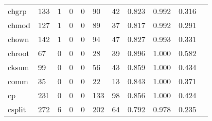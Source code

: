 \begin{longtable}{lp{1.10cm}p{1.10cm}p{1.10cm}p{1.10cm}p{1.10cm}p{1.10cm}p{1.10cm}p{1.10cm}p{1.10cm}p{1.10cm}}
chgrp     &                    133 &                                  1 &                                 0 &                                0 &                                90 &                              42 &                          0.823 &                                 0.992 &                               0.316 \\
chmod     &                    127 &                                  1 &                                 0 &                                0 &                                89 &                              37 &                          0.817 &                                 0.992 &                               0.291 \\
chown     &                    142 &                                  1 &                                 0 &                                0 &                                94 &                              47 &                          0.827 &                                 0.993 &                               0.331 \\
chroot    &                     67 &                                  0 &                                 0 &                                0 &                                28 &                              39 &                          0.896 &                                 1.000 &                               0.582 \\
cksum     &                     99 &                                  0 &                                 0 &                                0 &                                56 &                              43 &                          0.859 &                                 1.000 &                               0.434 \\
comm      &                     35 &                                  0 &                                 0 &                                0 &                                22 &                              13 &                          0.843 &                                 1.000 &                               0.371 \\
cp        &                    231 &                                  0 &                                 0 &                                0 &                               133 &                              98 &                          0.856 &                                 1.000 &                               0.424 \\
csplit    &                    272 &                                  6 &                                 0 &                                0 &                               202 &                              64 &                          0.792 &                                 0.978 &                               0.235 \\

\end{longtable}
